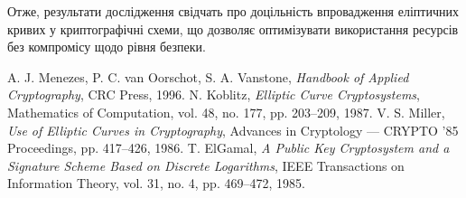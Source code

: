 \documentclass[12pt]{report}
\theoremstyle{definition}
\theoremstyle{plain}
\begin{document}
Отже, результати дослідження свідчать про доцільність впровадження еліптичних кривих у криптографічні схеми, що дозволяє оптимізувати використання ресурсів без компромісу щодо рівня безпеки.


\begin{thebibliography}{9}
 A. J. Menezes, P. C. van Oorschot, S. A. Vanstone, \textit{Handbook of Applied Cryptography}, CRC Press, 1996.
 N. Koblitz, \textit{Elliptic Curve Cryptosystems}, Mathematics of Computation, vol. 48, no. 177, pp. 203--209, 1987.
 V. S. Miller, \textit{Use of Elliptic Curves in Cryptography}, Advances in Cryptology — CRYPTO '85 Proceedings, pp. 417--426, 1986.
 T. ElGamal, \textit{A Public Key Cryptosystem and a Signature Scheme Based on Discrete Logarithms}, IEEE Transactions on Information Theory, vol. 31, no. 4, pp. 469--472, 1985.
\end{thebibliography}
\end{document}
